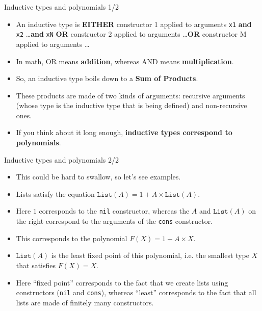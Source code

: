\documentclass{beamer}
\newcommand{\m}[1]{\texttt{#1}}
\begin{document}
\begin{frame}{Inductive types and polynomials 1/2}
\begin{itemize}
	\item An inductive type is \textbf{EITHER} constructor 1 applied to arguments \m{x1} \textbf{and} \m{x2} \dots \textbf{and} \m{xN} \textbf{OR} constructor 2 applied to arguments \dots \textbf{OR} constructor M applied to arguments \dots
	\item In math, OR means \textbf{addition}, whereas AND means \textbf{multiplication}.
	\item So, an inductive type boils down to a \textbf{Sum of Products}.
	\item These products are made of two kinds of arguments: recursive arguments (whose type is the inductive type that is being defined) and non-recursive ones.
	\item If you think about it long enough, \textbf{inductive types correspond to polynomials}.
\end{itemize}
\end{frame}

\begin{frame}{Inductive types and polynomials 2/2}
\begin{itemize}
	\item This could be hard to swallow, so let's see examples.
	\item Lists satisfy the equation $\m{List}(A) = 1 + A \times \m{List}(A)$.
	\item Here $1$ corresponds to the \m{nil} constructor, whereas the $A$ and $\m{List}(A)$ on the right correspond to the arguments of the \m{cons} constructor.
	\item This corresponds to the polynomial $F(X) = 1 + A \times X$.
	\item $\m{List}(A)$ is the least fixed point of this polynomial, i.e. the smallest type $X$ that satisfies $F(X) = X$.
	\item Here ``fixed point'' corresponds to the fact that we create lists using constructors (\m{nil} and \m{cons}), whereas ``least'' corresponds to the fact that all lists are made of finitely many constructors.
\end{itemize}
\end{frame}
\end{document}
